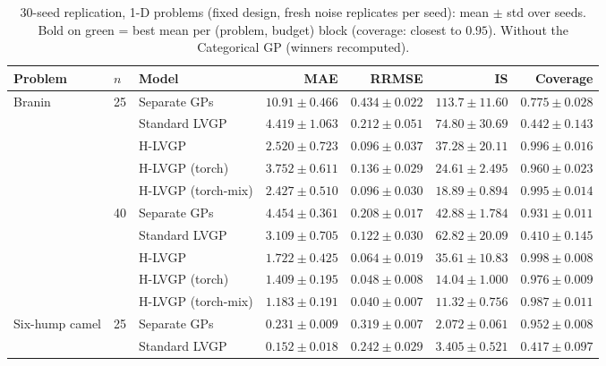 \begin{table}[htbp]
\centering
\small
%
\setlength{\tabcolsep}{3pt}
\caption{30-seed replication, 1-D problems (fixed design, fresh noise replicates per seed): mean $\pm$ std over seeds. Bold on green = best mean per (problem, budget) block (coverage: closest to $0.95$). Without the Categorical GP (winners recomputed).}
\label{tab:seeds_nocat}
\begin{tabular}{lllrrrr}
\toprule
Problem & $n$ & Model & MAE & RRMSE & IS & Coverage \\
\midrule
\multirow{10}{*}{Branin} & \multirow{5}{*}{25} & Separate GPs & $10.91 \pm 0.466$ & $0.434 \pm 0.022$ & $113.7 \pm 11.60$ & $0.775 \pm 0.028$ \\
 &  & Standard LVGP & $4.419 \pm 1.063$ & $0.212 \pm 0.051$ & $74.80 \pm 30.69$ & $0.442 \pm 0.143$ \\
 &  & H-LVGP & $2.520 \pm 0.723$ & \colorbox{green!20}{\boldmath$0.096 \pm 0.037$} & $37.28 \pm 20.11$ & $0.996 \pm 0.016$ \\
 &  & H-LVGP (torch) & $3.752 \pm 0.611$ & $0.136 \pm 0.029$ & $24.61 \pm 2.495$ & \colorbox{green!20}{\boldmath$0.960 \pm 0.023$} \\
 &  & H-LVGP (torch-mix) & \colorbox{green!20}{\boldmath$2.427 \pm 0.510$} & $0.096 \pm 0.030$ & \colorbox{green!20}{\boldmath$18.89 \pm 0.894$} & $0.995 \pm 0.014$ \\
\cmidrule(lr){2-7}
 & \multirow{5}{*}{40} & Separate GPs & $4.454 \pm 0.361$ & $0.208 \pm 0.017$ & $42.88 \pm 1.784$ & \colorbox{green!20}{\boldmath$0.931 \pm 0.011$} \\
 &  & Standard LVGP & $3.109 \pm 0.705$ & $0.122 \pm 0.030$ & $62.82 \pm 20.09$ & $0.410 \pm 0.145$ \\
 &  & H-LVGP & $1.722 \pm 0.425$ & $0.064 \pm 0.019$ & $35.61 \pm 10.83$ & $0.998 \pm 0.008$ \\
 &  & H-LVGP (torch) & $1.409 \pm 0.195$ & $0.048 \pm 0.008$ & $14.04 \pm 1.000$ & $0.976 \pm 0.009$ \\
 &  & H-LVGP (torch-mix) & \colorbox{green!20}{\boldmath$1.183 \pm 0.191$} & \colorbox{green!20}{\boldmath$0.040 \pm 0.007$} & \colorbox{green!20}{\boldmath$11.32 \pm 0.756$} & $0.987 \pm 0.011$ \\
\midrule
\multirow{10}{*}{Six-hump camel} & \multirow{5}{*}{25} & Separate GPs & $0.231 \pm 0.009$ & $0.319 \pm 0.007$ & $2.072 \pm 0.061$ & \colorbox{green!20}{\boldmath$0.952 \pm 0.008$} \\
 &  & Standard LVGP & \colorbox{green!20}{\boldmath$0.152 \pm 0.018$} & \colorbox{green!20}{\boldmath$0.242 \pm 0.029$} & $3.405 \pm 0.521$ & $0.417 \pm 0.097$ \\

\end{tabular}
\end{table}
